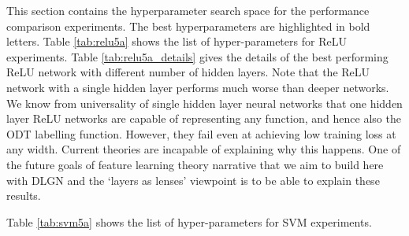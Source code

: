 \documentclass{article}
\theoremstyle{plain}
\theoremstyle{definition}
\theoremstyle{remark}
\newcommand{\1}{{\mathbf 1}}
\newcommand{\0}{{\mathbf 0}}
\renewcommand{\>}{{\rightarrow}}
\begin{document}
This section contains the hyperparameter search space for the performance comparison experiments. The best hyperparameters are highlighted in bold letters. Table \ref{tab:relu5a} shows the list of hyper-parameters for ReLU experiments. Table \ref{tab:relu5a_details} gives the details of the best performing ReLU network with different number of hidden layers. Note that the ReLU network with a single hidden layer performs much worse than deeper networks. We know from universality of single hidden layer neural networks that one hidden layer ReLU networks are capable of representing any function, and hence also the ODT labelling function. However, they fail even at achieving low training loss at any width. Current theories are incapable of explaining why this happens. One of the future goals of feature learning theory narrative that we aim to build here with DLGN and the `layers as lenses' viewpoint is to be able to explain these results. 

 Table \ref{tab:svm5a} shows the list of hyper-parameters for SVM experiments.


\end{document}
